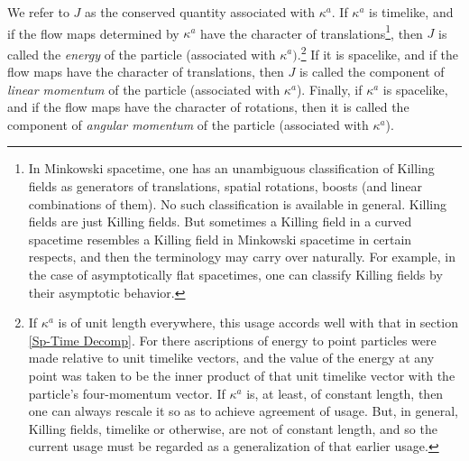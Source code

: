 \documentclass [12] {article}
\theoremstyle{plain}
\numberwithin{figure}{subsection}
\numberwithin{proposition}{subsection}
\begin{document}
We refer to $J$ as the conserved quantity associated with $\kappa^a$. If $\kappa^a$ is timelike, and if the flow maps  
determined by $\kappa^a$ have the character of translations\footnote{In Minkowski spacetime, one has an unambiguous classification of  Killing fields as generators of translations, spatial rotations, boosts (and linear combinations  of them).   No such classification is available in general. Killing fields are just Killing fields.  But sometimes a Killing field  in a curved spacetime resembles a Killing field in Minkowski spacetime in certain respects, and then the terminology may carry over naturally.  For example, in the case of asymptotically flat spacetimes, one can classify Killing fields by their asymptotic behavior.}, then $J$ is called the \emph{energy} of the particle (associated with  $\kappa^a)$.\footnote{If $\kappa^a$ is of unit length everywhere, this usage accords well with that in section \ref{Sp-Time Decomp}. For there ascriptions of energy to point particles were made relative to unit timelike vectors, and the value of the energy at any point was taken to be the inner product of that unit timelike vector with the particle's four-momentum vector. If $\kappa^a$ is, at least, of constant length, then one can always rescale it so as to achieve agreement of usage. But, in general, Killing fields, timelike or otherwise, are not of constant length, and so the current usage must be regarded as a generalization of that earlier usage.} If it is spacelike, and if the flow maps
have the character of translations, then $J$ is called the component of \emph{linear momentum} of the particle (associated with  $\kappa^a$). Finally,  if $\kappa^a$ is spacelike, and if the flow maps have the character of rotations, then it is called the component of \emph{angular momentum} of the particle (associated with  $\kappa^a$). 
\end{document}
